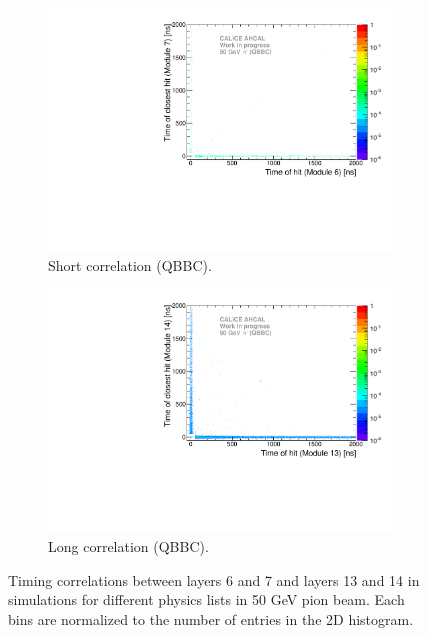\begin{figure}[htbp!]
\begin{subfigure}[t]{0.5\textwidth}
		\includegraphics[width=1\textwidth]{../Thesis_Plots/Timing/Pions/Plots/ComparisonToSim/Time_Correlation_50GeV_short_QBBC.pdf}
		\caption{Short correlation (QBBC).} \label{fig:Corr_short_QBBC}
	\end{subfigure}
	\hfill
	\begin{subfigure}[t]{0.5\textwidth}
		\centering
		\includegraphics[width=1\textwidth]{../Thesis_Plots/Timing/Pions/Plots/ComparisonToSim/Time_Correlation_50GeV_long_QBBC.pdf}
		\caption{Long correlation (QBBC).} \label{fig:Corr_long_QBBC}
	\end{subfigure}
	\caption{Timing correlations between layers 6 and 7 and layers 13 and 14 in \mokka simulations for different physics lists in 50 GeV pion beam. Each bins are normalized to the number of entries in the 2D histogram.}
	\label{fig:Corr_Mokka_Simulation}
\end{figure}

